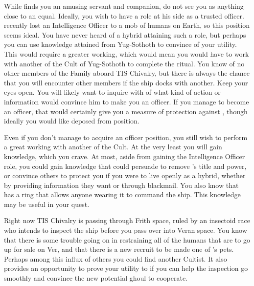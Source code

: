 \documentclass[char]{guildcamp4}
\begin{document}
While \cVone{} finds you an amusing servant and companion, \cVone{\they} do not see you as anything close to an equal. Ideally, you wish to have a role at his side as a trusted officer. \cVone{} recently lost an Intelligence Officer to a mob of humans on Earth, so this position seems ideal. You have never heard of a hybrid attaining such a role, but perhaps you can use knowledge attained from Yug-Sothoth to convince \cVone{} of your utility. This would require a greater working, which would mean you would have to work with another of the Cult of Yug-Sothoth to complete the ritual. You know of no other members of the Family aboard TIS Chivalry, but there is always the chance that you will encounter other members if the ship docks with another. Keep your eyes open. You will likely want to inquire with \cVone{} of what kind of action or information would convince him to make you an officer. If you manage to become an officer, that would certainly give you a measure of protection against \cVthree{}, though ideally you would like \cVthree{\them} deposed from \cVthree{\their} position.

Even if you don't manage to acquire an officer position, you still wish to perform a great working with another of the Cult. At the very least you will gain knowledge, which you crave. At most, aside from gaining the Intelligence Officer role, you could gain knowledge that could persuade \cVone{} to remove \cVthree{}'s title and power, or convince others to protect you if you were to live openly as a hybrid, whether by providing information they want or through blackmail. You also know that \cVone{} has a ring that allows anyone wearing it to command the ship. This knowledge may be useful in your quest.

Right now TIS Chivalry is passing through Frith space, ruled by an insectoid race who intends to inspect the ship before you pass over into Veran space. You know that there is some trouble going on in restraining all of the humans that are to go up for sale on Ver, and that there is a new recruit to be made one of \cVone{}'s pets. Perhaps among this influx of others you could find another Cultist. It also provides an opportunity to prove your utility to \cVone{} if you can help the inspection go smoothly and convince the new potential ghoul to cooperate. 
\end{document}
